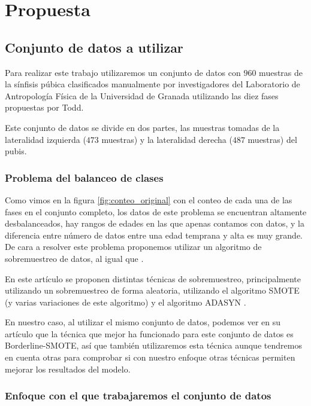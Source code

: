 \section{Propuesta}

\subsection{Conjunto de datos a utilizar}

Para realizar este trabajo utilizaremos un conjunto de datos con $960$ muestras de la sínfisis púbica clasificados manualmente por investigadores del Laboratorio de Antropología Física de la Universidad de Granada utilizando las diez fases propuestas por Todd.

Este conjunto de datos se divide en dos partes, las muestras tomadas de la lateralidad izquierda ($473$ muestras) y la lateralidad derecha ($487$ muestras) del pubis.

\subsubsection{Problema del balanceo de clases}

Como vimos en la figura \ref{fig:conteo_original} con el conteo de cada una de las fases en el conjunto completo, los datos de este problema se encuentran altamente desbalanceados, hay rangos de edades en las que apenas contamos con datos, y la diferencia entre número de datos entre una edad temprana y alta es muy grande. De cara a resolver este problema proponemos utilizar un algoritmo de sobremuestreo de datos, al igual que \cite{NSLVOrdAge}.

En este artículo se proponen distintas técnicas de sobremuestreo, principalmente utilizando un sobremuestreo de forma aleatoria, utilizando el algoritmo SMOTE \cite{revisionSMOTE} (y varias variaciones de este algoritmo) y el algoritmo ADASYN \cite{propuestaADASYN}.

En nuestro caso, al utilizar el mismo conjunto de datos, podemos ver en su artículo que la técnica que mejor ha funcionado para este conjunto de datos es Borderline-SMOTE, así que también utilizaremos esta técnica aunque tendremos en cuenta otras para comprobar si con nuestro enfoque otras técnicas permiten mejorar los resultados del modelo.

\subsubsection{Enfoque con el que trabajaremos el conjunto de datos}


